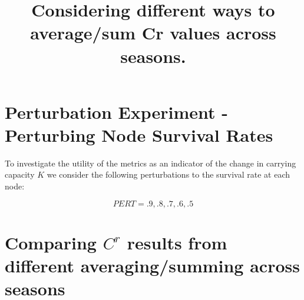 \documentclass[10pt]{article}
\title{Considering different ways to average/sum Cr values across seasons.}
\date{}
\author{}
\begin{document}


\newcommand{\multilineR}[1]{\begin{tabular}[b]{@{}r@{}}#1\end{tabular}}
\newcommand{\multilineL}[1]{\begin{tabular}[b]{@{}l@{}}#1\end{tabular}}
\newcommand{\multilineC}[1]{\begin{tabular}[b]{@{}c@{}}#1\end{tabular}}

\thispagestyle{empty}

\maketitle

\tableofcontents



\section{Perturbation Experiment - Perturbing Node Survival Rates}

To investigate the utility of the metrics as an indicator of the change in carrying capacity $K$ we consider the following perturbations to the survival rate at each node:

\[PERT = .9, .8, .7, .6, .5\]

\newpage 





\newpage
\section{Comparing \texorpdfstring{$C^r$}{CR} results from different averaging/summing across seasons}
\end{document}
